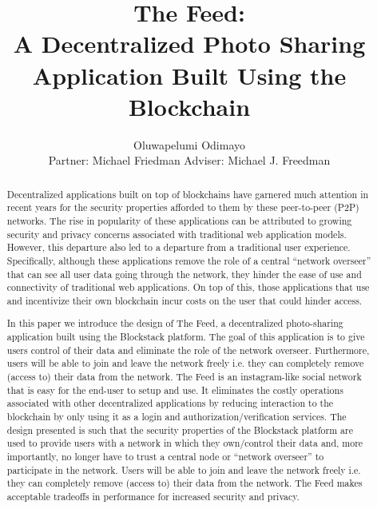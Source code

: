 \documentclass[pageno]{jpaper}
\begin{document}
\title{
The Feed:\\
A Decentralized Photo Sharing Application Built Using the Blockchain}

\author{Oluwapelumi Odimayo \\Partner: Michael Friedman Adviser: Michael J. Freedman}

\date{}
\maketitle
\fontsize{10.2}{1.2}\selectfont

\begin{multicols*}{2}
\thispagestyle{empty}


\begin{abstract}

Decentralized applications built on top of blockchains have garnered much attention in recent years for the security properties afforded to them by these peer-to-peer (P2P) networks. The rise in popularity of these applications can be attributed to growing security and privacy concerns associated with traditional web application models. However, this departure also led to a departure from a traditional user experience. Specifically, although these applications remove the role of a central “network overseer” that can see all user data going through the network, they hinder the ease of use and connectivity of traditional web applications. On top of this, those applications that use and incentivize their own blockchain incur costs on the user that could hinder access.\par
In this paper we introduce the design of The Feed, a decentralized photo-sharing application built using the Blockstack platform. The goal of this application is to give users control of their data and eliminate the role of the network overseer. Furthermore, users will be able to join and leave the network freely i.e. they can completely remove (access to) their data from the network. The Feed is an instagram-like social network that is easy for the end-user to setup and use. It eliminates the costly operations associated with other decentralized applications by reducing interaction to the blockchain by only using it as a login and authorization/verification services. The design presented is such that the security properties of the Blockstack platform are used to provide users with a network in which they own/control their data and, more importantly, no longer have to trust a central node or “network overseer” to participate in the network.  Users will be able to join and leave the network freely i.e. they can completely remove (access to) their data from the network. The Feed makes acceptable tradeoffs in performance for increased security and privacy.


\end{abstract}
\end{multicols*}
\end{document}

